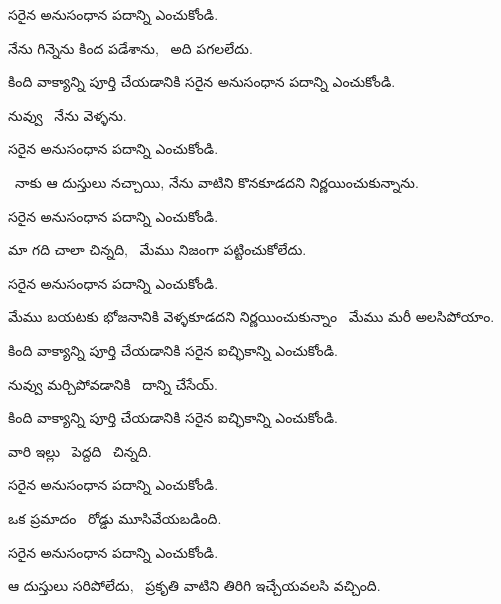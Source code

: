 \begin{questions}
 సరైన అనుసంధాన పదాన్ని  ఎంచుకోండి.\par
నేను గిన్నెను కింద పడేశాను, \blank\ అది పగలలేదు.

 కింది వాక్యాన్ని పూర్తి చేయడానికి సరైన అనుసంధాన పదాన్ని  ఎంచుకోండి.\par
నువ్వు \blank\ నేను వెళ్ళను.

 సరైన అనుసంధాన పదాన్ని  ఎంచుకోండి.\par
\blank\ నాకు ఆ దుస్తులు నచ్చాయి, నేను వాటిని కొనకూడదని నిర్ణయించుకున్నాను.

 సరైన అనుసంధాన పదాన్ని  ఎంచుకోండి.\par
మా గది చాలా చిన్నది, \blank\ మేము నిజంగా పట్టించుకోలేదు.

 సరైన అనుసంధాన పదాన్ని  ఎంచుకోండి.\par
మేము బయటకు భోజనానికి వెళ్ళకూడదని నిర్ణయించుకున్నాం \blank\ మేము మరీ అలసిపోయాం.

 కింది వాక్యాన్ని పూర్తి చేయడానికి సరైన ఐచ్ఛికాన్ని ఎంచుకోండి.\par
నువ్వు మర్చిపోవడానికి \blank\ దాన్ని చేసేయ్.

 కింది వాక్యాన్ని పూర్తి చేయడానికి సరైన ఐచ్ఛికాన్ని ఎంచుకోండి.\par
వారి ఇల్లు \blank\ పెద్దది \blank\ చిన్నది.

 సరైన అనుసంధాన పదాన్ని  ఎంచుకోండి.\par
ఒక ప్రమాదం \blank\ రోడ్డు మూసివేయబడింది.

 సరైన అనుసంధాన పదాన్ని  ఎంచుకోండి.\par
ఆ దుస్తులు సరిపోలేదు, \blank\ ప్రకృతి వాటిని తిరిగి ఇచ్చేయవలసి వచ్చింది.


\end{questions}
